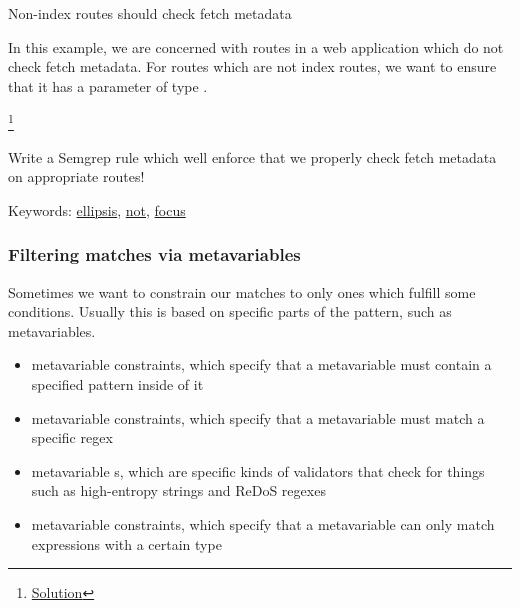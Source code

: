 \documentclass[aspectratio=169, handout]{beamer}
\newenvironment{exercisePage}[1]{
  \begin{minipage}[t][0.4in][t]{\textwidth}
    \Large \term{Exercise:} #1
  \end{minipage}
  \begin{minipage}[t][2.6in][t]{\textwidth}
}{
  \end{minipage}
}
\newcommand\blfootnote[1]{
    \begingroup
    \renewcommand\thefootnote{}\footnote{#1}
    \addtocounter{footnote}{-1}
    \endgroup
}
\newcommand\solutionLink[1]{
  \blfootnote{\color{blue}\href{#1}{Solution}}
}
\newcommand\ellipsisLink[1][]{{\color{blue}\href{https://semgrep.dev/docs/writing-rules/pattern-syntax\#ellipsis-operator}{ellipsis}}}
\newcommand\patternNotLink[1][]{{\color{blue}\href{https://semgrep.dev/docs/writing-rules/rule-syntax\#pattern-not}{not}}}
\newcommand\focusLink[1][]{{\color{blue}\href{https://semgrep.dev/docs/writing-rules/rule-syntax\#focus-metavariable}{focus}}}
\begin{document}
\begin{frame}[fragile]
  \begin{exercisePage}{Non-index routes should check fetch metadata}

  In this example, we are concerned with routes in a web application which do not
  check fetch metadata. For routes which are not index routes, we want to ensure
  that it has a parameter of type .
  \solutionLink{https://semgrep.dev/playground/r/KxUv69E/semgrep.secfetch-metadata-solution}

  \vspace{\fill}

  Write a Semgrep rule which well enforce that we properly check fetch metadata on
  appropriate routes!

  \vspace{\fill}

  Keywords: \ellipsisLink, \patternNotLink, \focusLink
  \end{exercisePage}
\end{frame}

\begin{frame}[fragile]
  \frametitle{Filtering matches via metavariables}

  Sometimes we want to constrain our matches to only ones which fulfill some conditions.
  Usually this is based on specific parts of the pattern, such as metavariables.

  \pause
  \vspace{\fill}

  \pause
  \begin{itemize}
    \item metavariable  constraints, which specify that a metavariable
    must contain a specified pattern inside of it
    \pause
    \item metavariable  constraints, which specify that a metavariable
    must match a specific regex
    \pause
    \item metavariable s, which are specific kinds of validators
    that check for things such as high-entropy strings and ReDoS regexes
    \pause
    \item metavariable  constraints, which specify that a metavariable
    can only match expressions with a certain type
  \end{itemize}
\end{frame}
\end{document}
